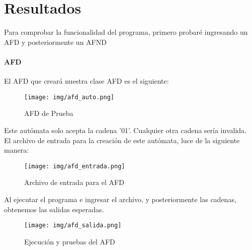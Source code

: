 \section{Resultados}
	Para comprobar la funcionalidad del programa, primero probaré ingresando un AFD y posteriormente un AFND
	\paragraph{AFD}
	El AFD que creará nuestra clase AFD es el siguiente:
	\begin{figure}[H]
		\begin{center}
			\texttt{[image: img/afd\_auto.png]}
			\caption{AFD de Prueba}
			\label{fig:tablas}
		\end{center}
	\end{figure}
	Este autómata solo acepta la cadena '01'. Cualquier otra cadena sería invalida.\\
	El archivo de entrada para la creación de este autómata, luce de la siguiente manera:
	\begin{figure}[H]
		\begin{center}
			\texttt{[image: img/afd\_entrada.png]}
			\caption{Archivo de entrada para el AFD}
			\label{fig:tablas}
		\end{center}
	\end{figure}
	Al ejecutar el programa e ingresar el archivo, y posteriormente las cadenas, obtenemos las salidas esperadas.
	\begin{figure}[H]
		\begin{center}
			\texttt{[image: img/afd\_salida.png]}
			\caption{Ejecución y pruebas del AFD}
			\label{fig:tablas}
		\end{center}
	\end{figure}
	\newpage
